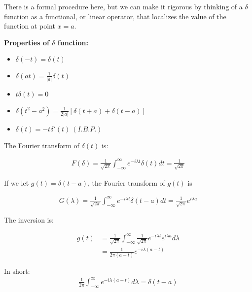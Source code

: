 \documentclass{article}
\theoremstyle{definition}
\begin{document}
There is a formal procedure here, but we can make it rigorous by thinking of a $\delta$ function as a functional, or linear operator, that localizes the value of the function at point $x=a$.

\textbf{Properties of $\delta$ function:}
\begin{itemize}
	\item $\delta(-t) = \delta(t)$ 
	\item $\delta(at) = \frac{1}{|a|}\delta(t)$
	\item $t\delta(t) = 0$
	\item $\delta(t^2 - a^2) = \frac{1}{2|a|}\left[\delta(t+a) + \delta(t-a)\right]$
	\item $\delta(t) = -t \delta ' (t) \ (I.B.P.)$
\end{itemize}

The Fourier transform of $\delta(t)$ is:

\begin{align*}
F(\delta) = \frac{1}{\sqrt{2\pi}} \int_{-\infty}^{\infty} e^{- i \lambda t} \delta(t) dt  = \frac{1}{\sqrt{2\pi}} 
\end{align*}

If we let $g(t) = \delta(t-a)$, the Fourier transform of $g(t)$ is 

\begin{align*}
G(\lambda) = \frac{1}{\sqrt{2\pi}} \int_{-\infty}^{\infty} e^{- i \lambda t} \delta(t-a) dt  = \frac{1}{\sqrt{2\pi}} e^{i \lambda a}
\end{align*}

The inversion is:

\begin{align*}
g(t) &=  \frac{1}{\sqrt{2\pi}} \int_{-\infty}^{\infty}\frac{1}{\sqrt{2\pi}} e^{- i \lambda t}  e^{i \lambda a} d\lambda \\ 
&= \frac{1}{2\pi(a-t)} e^{- i \lambda (a-t)} 
\end{align*}

In short:
\begin{align*}
\frac{1}{2\pi} \int_{-\infty}^{\infty} e^{- i \lambda( a-t)} d\lambda = \delta(t-a) 
\end{align*}
\end{document}
